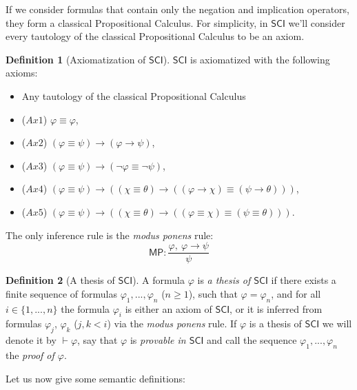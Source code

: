 \documentclass{article}
\theoremstyle{definition}
\newtheorem{definition}{Definition}[section]
\newcommand*{\id}{\equiv}
\newcommand*{\ra}{\rightarrow}
\newcommand{\SCI}{$\mathsf{SCI}$\xspace}
\begin{document}
If we consider formulas that contain only the negation and implication
operators, they form a classical Propositional Calculus. For simplicity, in
\SCI we'll consider every tautology of the classical Propositional Calculus to
be an axiom.

\begin{definition}[Axiomatization of \SCI]
    \SCI is axiomatized with the following axioms:
    \begin{itemize}
        \item Any tautology of the classical Propositional Calculus
        \item ($Ax1$) $\varphi \id \varphi$,
        \item ($Ax2$) $(\varphi \id \psi) \ra (\varphi \ra \psi)$,
        \item ($Ax3$) $(\varphi \id \psi) \ra (\lnot \varphi \id \lnot \psi)$,
        \item ($Ax4$) $(\varphi \id \psi) \ra ((\chi \id \theta) \ra ((\varphi \ra \chi) \id (\psi \ra \theta)))$,
        \item ($Ax5$) $(\varphi \id \psi) \ra ((\chi \id \theta) \ra ((\varphi \id \chi) \id (\psi \id \theta)))$.
    \end{itemize}
    The only inference rule is the \emph{modus ponens} rule:
    $$
        \mathsf{MP}: \frac{
            \varphi, \ \varphi \ra \psi}%
        { \psi }
    $$
\end{definition}

\begin{definition}[A thesis of \SCI]
    A formula $\varphi$ is \emph{a thesis of \SCI} if there exists a finite sequence of formulas $\varphi_1, ..., \varphi_n$ ($n \geq 1$), such that $\varphi = \varphi_n$, and for all $i \in \{1, ..., n\}$ the formula $\varphi_i$ is either an axiom of \SCI, or it is inferred from formulas $\varphi_j$, $\varphi_k$ ($j, k <i$) via the \emph{modus ponens} rule. If $\varphi$ is a thesis of \SCI we will denote it by $\vdash \varphi$, say that $\varphi$ is \emph{provable in \SCI} and call the sequence $\varphi_1, ..., \varphi_n$ the \emph{proof of $\varphi$}.
    \label{thesis}
\end{definition}

Let us now give some semantic definitions:
\end{document}
